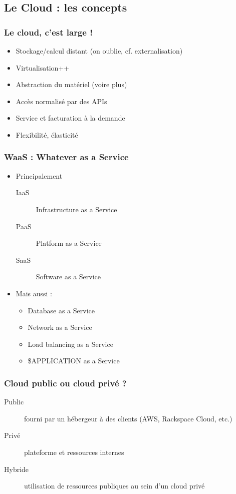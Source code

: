  \subsection[Cloud]{Le Cloud : les concepts}

  \begin{frame}
    \frametitle{Le cloud, c'est large !}
    \begin{itemize}
      \item Stockage/calcul distant \pause (on oublie, cf. externalisation)\pause
      \item Virtualisation++\pause
      \item Abstraction du matériel (voire plus)\pause
      \item Accès normalisé par des APIs\pause
      \item Service et facturation à la demande\pause
      \item Flexibilité, élasticité
    \end{itemize}
  \end{frame}

  \begin{frame}
    \frametitle{WaaS : Whatever as a Service}
    \begin{itemize}
      \item Principalement\pause
      \begin{description}
        \item[IaaS] \alert<5->{Infrastructure as a Service}\pause
        \item[PaaS] Platform as a Service\pause
        \item[SaaS] Software as a Service\pause
      \end{description}
      \pause
      \item Mais aussi :
      \pause
      \begin{itemize}
        \item Database as a Service
        \item Network as a Service
        \item Load balancing as a Service\pause
        \item \$APPLICATION as a Service
      \end{itemize}
    \end{itemize}
  \end{frame}

  \begin{frame}
    \frametitle{Cloud public ou cloud privé ?}
    \begin{description}
      \item[Public] fourni par un hébergeur à des clients (AWS, Rackspace Cloud, etc.)
      \item[Privé] plateforme et ressources internes
      \item[Hybride] utilisation de ressources publiques au sein d'un cloud privé
    \end{description}
  \end{frame}

